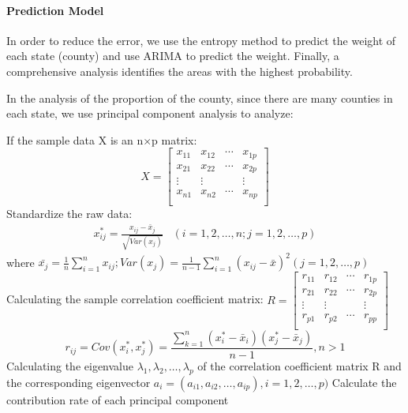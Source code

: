 \documentclass[12pt]{mcmthesis}
\begin{document}
\paragraph{Prediction Model}
In order to reduce the error, we use the entropy method to predict the weight of each state (county) and use ARIMA to predict the weight. Finally, a comprehensive analysis identifies the areas with the highest probability.\par
In the analysis of the proportion of the county, since there are many counties in each state, we use principal component analysis to analyze\cite{zhuchengfen}:\par If the sample data X is an n$\times$p matrix:
$$X=\left[
      \begin{array}{cccc}
        x_{11} & x_{12} & \cdots&x_{1p} \\
        x_{21} & x_{22} & \cdots& x_{2p}\\
        \vdots&\vdots& &\vdots\\
        x_{n1} & x_{n2} & \cdots&x_{np} \\
      \end{array}
    \right]
$$
Standardize the raw data:
\begin{equation}
\begin{array}{ccc}
  x_{ij}^*=\frac{x_{ij}-\bar{x}_j}{\sqrt{Var(x_j)}}&(i=1,2,\dotsc,n;j=1,2,\dotsc,p)
  \end{array}
\end{equation}
where
$ \bar{x_j}=\frac{1}{n}\sum_{i=1}^{n}x_{ij};Var(x_j)=\frac{1}{n-1}\sum_{i=1}^{n}(x_{ij}-\bar{x})^2(j=1,2,\dotsc,p)$\\
Calculating the sample correlation coefficient matrix:
$R=\left[
      \begin{array}{cccc}
        r_{11} & r_{12} & \cdots&r_{1p} \\
        r_{21} & r_{22} & \cdots& r_{2p}\\
        \vdots&\vdots& &\vdots\\
        r_{p1} & r_{p2} & \cdots&r_{pp} \\
      \end{array}
    \right]
$
\begin{equation}
r_{ij}=Cov(x_i^*,x_j^*)=\frac{\sum_{k=1}^{n}(x_i^*-\bar{x}_i)(x_j^*-\bar{x}_j)}{n-1},n>1
\end{equation}
Calculating the eigenvalue $\lambda_1,\lambda_2,\dotsc,\lambda_p$ of the correlation coefficient matrix R and the corresponding eigenvector
$a_i=(a_{i1},a_{i2},\dotsc,a_{ip}),i=1,2,\dotsc,p)$
Calculate the contribution rate of each principal component
\end{document}
